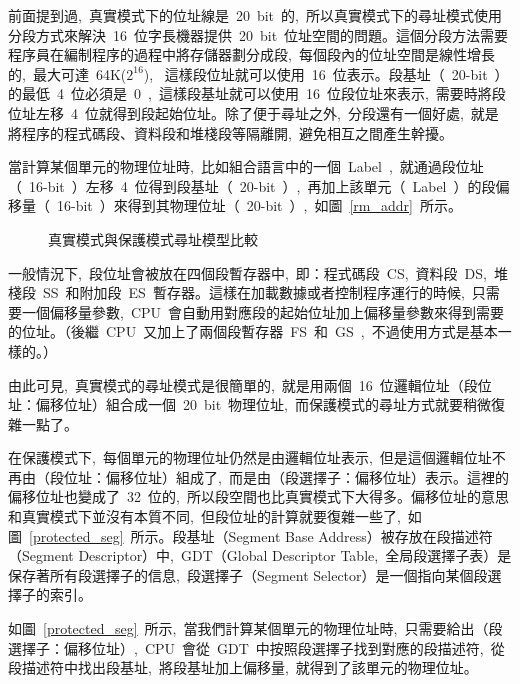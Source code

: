 前面提到過,~真實模式下的位址線是~20~bit~的,~所以真實模式下的尋址模式使用分段方式來解決~16~位字長機器提供~20~bit~位址空間的問題。這個分段方法需要程序員在編制程序的過程中將存儲器劃分成段,~每個段內的位址空間是線性增長的,~最大可達~64K($2^16$),~
這樣段位址就可以使用~16~位表示。段基址（~20-bit~）的最低~4~位必須是~0~,~這樣段基址就可以使用~16~位段位址來表示,~需要時將段位址左移~4~位就得到段起始位址。除了便于尋址之外,~分段還有一個好處,~就是將程序的程式碼段、資料段和堆棧段等隔離開,~避免相互之間產生幹擾。

當計算某個單元的物理位址時,~比如組合語言中的一個~Label~,~就通過段位址（~16-bit~）左移~4~位得到段基址（~20-bit~）,~再加上該單元（~Label~）的段偏移量（~16-bit~）來得到其物理位址（~20-bit~）,~如圖~\ref{rm_addr}~所示。

\begin{figure*}[!t]
\centerline{
\hfil
{}}
\caption{真實模式與保護模式尋址模型比較}
\label{real_vs_pro}
\end{figure*}

一般情況下,~段位址會被放在四個段暫存器中,~即：程式碼段~CS,~資料段~DS,~堆棧段~SS~和附加段~ES~暫存器。這樣在加載數據或者控制程序運行的時候,~只需要一個偏移量參數,~CPU~會自動用對應段的起始位址加上偏移量參數來得到需要的位址。（後繼~CPU~又加上了兩個段暫存器~FS~和~GS~,~不過使用方式是基本一樣的。）

由此可見,~真實模式的尋址模式是很簡單的,~就是用兩個~16~位邏輯位址（段位址：偏移位址）組合成一個~20~bit~物理位址,~而保護模式的尋址方式就要稍微復雜一點了。


在保護模式下,~每個單元的物理位址仍然是由邏輯位址表示,~但是這個邏輯位址不再由（段位址：偏移位址）組成了,~而是由（段選擇子：偏移位址）表示。這裡的偏移位址也變成了~32~位的,~所以段空間也比真實模式下大得多。偏移位址的意思和真實模式下並沒有本質不同,~但段位址的計算就要復雜一些了,~如圖~\ref{protected_seg}~所示。段基址（Segment Base Address）被存放在段描述符（Segment Descriptor）中,~GDT（Global Descriptor Table,~全局段選擇子表）是保存著所有段選擇子的信息,~段選擇子（Segment Selector）是一個指向某個段選擇子的索引。

如圖~\ref{protected_seg}~所示,~當我們計算某個單元的物理位址時,~只需要給出（段選擇子：偏移位址）,~CPU~會從~GDT~中按照段選擇子找到對應的段描述符,~從段描述符中找出段基址,~將段基址加上偏移量,~就得到了該單元的物理位址。

